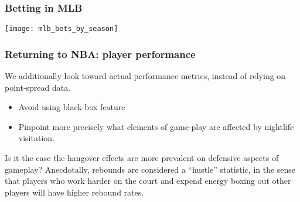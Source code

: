 \documentclass{beamer}
\begin{document}
\begin{frame}   \frametitle{Betting in MLB}
  \centering
  \texttt{[image: mlb\_bets\_by\_season]} \end{frame}

\begin{frame}   \frametitle{Returning to NBA: player performance}
  We additionally look toward actual performance metrics, instead of relying on point-spread data.
  
  \vspace{12pt}
  \begin{itemize}     
    \item Avoid using black-box feature
    \item Pinpoint more precisely what elements of game-play are affected by nightlife visitation.   
\end{itemize}

  \vspace{12pt}  
  \begin{block}{Is it the case the hangover effects are more prevalent on defensive aspects of gameplay?}     Anecdotally, rebounds are considered a ``hustle'' statistic, in the sense that players
    who work harder on the court and expend energy boxing out other players will have higher
    rebound rates.    \end{block}
\end{frame}
\end{document}
